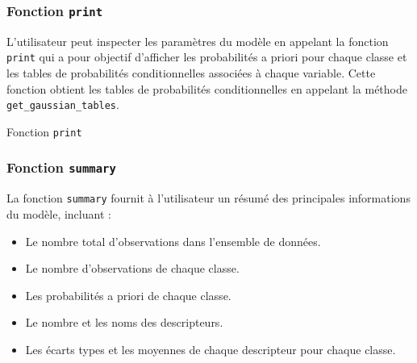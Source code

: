 \documentclass[]{article}
\begin{document}
\subsubsection{Fonction \texttt{print}}
L'utilisateur peut inspecter les paramètres du modèle en appelant la fonction \texttt{print} qui a pour objectif d'afficher les probabilités a priori pour chaque classe et les tables de probabilités conditionnelles associées à chaque variable. Cette fonction obtient les tables de probabilités conditionnelles en appelant la méthode \texttt{get\_gaussian\_tables}.

\vspace{0.3\baselineskip}

\begin{algorithm}
    \caption{Fonction \texttt{print}}
    

\end{algorithm}

\vspace{0.3\baselineskip} 
\subsubsection{Fonction \texttt{summary}}
La fonction \texttt{summary} fournit à l'utilisateur un résumé des principales informations du modèle, incluant :
\begin{itemize}
    \item Le nombre total d'observations dans l'ensemble de données.
    \item Le nombre d'observations de chaque classe.
    \item Les probabilités a priori de chaque classe.
    \item Le nombre et les noms des descripteurs.
    \item Les écarts types et les moyennes de chaque descripteur pour chaque classe.
\end{itemize}
\end{document}
